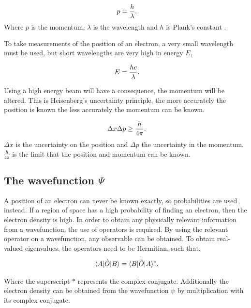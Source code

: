 \begin{equation}
\ p = \frac{h}{\lambda} \\.
\end{equation}
%
Where $p$ is the momentum, $\lambda$ is the wavelength and $h$ is Plank's constant \cite{Planck}.

To take measurements of the position of an electron, a very small wavelength must be used, but short wavelengths are very high in energy $E$,

\begin{equation}
\ E= \frac{hc}{\lambda} \\.
\end{equation}

Using a high energy beam will have a consequence, the momentum will be altered.  This is Heisenberg's uncertainty principle\cite{Heisenberg}, the more accurately the position is known the less accurately the momentum can be known.

\begin{equation}
\ \Delta x \Delta p \geq \frac{h}{4 \pi} \\.
\end{equation} 
%
$\Delta x$ is the uncertainty on the position and $\Delta p$ the uncertainty in the momentum.  $\frac{h}{4 \pi}$ is the limit that the position and momentum can be known.

\subsection{The wavefunction $\Psi$}

A position of an electron can never be known exactly, so probabilities are used instead.  If a region of space has a high probability of finding an electron, then the electron density is high\cite{chemical_bonding}.  In order to obtain any physically relevant information from a wavefunction, the use of operators is required. By using the relevant operator on a wavefunction, any observable can be obtained.  To obtain real-valued eigenvalues, the operators need to be Hermitian, such that\cite{susskind_quantum},

\begin{equation}
\ \langle A | \hat{O} | B \rangle = \langle B | \hat{O} | A \rangle^* \\.
\end{equation}

Where the superscript $*$ represents the complex conjugate.  Additionally the electron density can be obtained from the wavefunction $\psi$ by multiplication with its complex conjugate.

